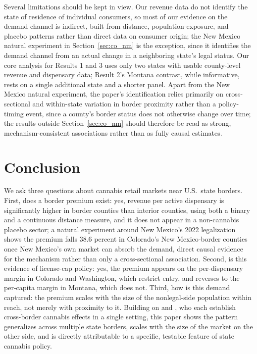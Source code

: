 \documentclass[12pt]{article}
\begin{document}
Several limitations should be kept in view. Our revenue data do not identify the state of residence of
individual consumers, so most of our evidence on the demand channel is indirect, built from distance,
population-exposure, and placebo patterns rather than direct data on consumer origin; the New Mexico natural
experiment in Section~\ref{sec:co_nm} is the exception, since it identifies the demand channel from an actual
change in a neighboring state's legal status. Our core analysis for Results 1 and 3 uses only two states with
usable county-level revenue and dispensary data; Result 2's Montana contrast, while informative, rests on a
single additional state and a shorter panel. Apart from the New Mexico natural experiment, the paper's
identification relies primarily on cross-sectional and within-state variation in border proximity rather than
a policy-timing event, since a county's border status does not otherwise change over time; the results outside
Section~\ref{sec:co_nm} should therefore be read as strong, mechanism-consistent associations rather than as
fully causal estimates.

\section{Conclusion}

We ask three questions about cannabis retail markets near U.S.\ state borders. First, does a border premium
exist: yes, revenue per active dispensary is significantly higher in border counties than interior counties,
using both a binary and a continuous distance measure, and it does not appear in a non-cannabis placebo
sector; a natural experiment around New Mexico's 2022 legalization shows the premium falls 38.6 percent in
Colorado's New Mexico-border counties once New Mexico's own market can absorb the demand, direct causal
evidence for the mechanism rather than only a cross-sectional association. Second, is this evidence of
license-cap policy: yes, the premium appears on the per-dispensary margin
in Colorado and Washington, which restrict entry, and reverses to the per-capita margin in Montana, which
does not. Third, how is this demand captured: the premium scales with the size of the nonlegal-side
population within reach, not merely with proximity to it. Building on \citet{HansenMillerWeber2020} and
\citet{HaoCowan2020}, who each establish cross-border cannabis effects in a single setting, this paper shows
the pattern generalizes across multiple state borders, scales with the size of the market on the other side,
and is directly attributable to a specific, testable feature of state cannabis policy.
\end{document}
